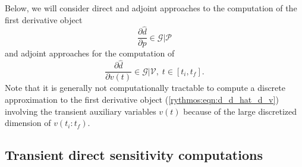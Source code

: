 \documentclass[pdf,ps2pdf,11pt]{SANDreport}
\begin{document}
Below, we will consider direct and adjoint approaches to the computation of
the first derivative object
%
\begin{equation}
\frac{\partial \hat{d}}{\partial p} \in \mathcal{G}|\mathcal{P}
\label{rythmos:eqn:d_d_hat_d_p}
\end{equation}
%
and adjoint approaches for the computation of
%
\begin{equation}
\frac{\partial \hat{d}}{\partial v(t)} \in \mathcal{G}|\mathcal{V}, \; t \in [t_i,t_f].
\label{rythmos:eqn:d_d_hat_d_v}
\end{equation}
%
Note that it is generally not computationally tractable to compute a discrete
approximation to the first derivative object (\ref{rythmos:eqn:d_d_hat_d_v})
involving the transient auxiliary variables $v(t)$ because of the large
discretized dimension of $v(t_i:t_f)$.

\subsection{Transient direct sensitivity computations}
\end{document}
